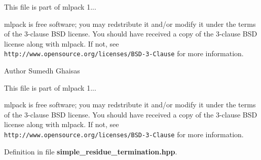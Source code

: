 This file is part of mlpack 1...

mlpack is free software; you may redstribute it and/or modify it under the terms of the 3-\/clause B\-S\-D license. You should have received a copy of the 3-\/clause B\-S\-D license along with mlpack. If not, see {\tt http\-://www.\-opensource.\-org/licenses/\-B\-S\-D-\/3-\/\-Clause} for more information.

\begin{DoxyAuthor}{Author}
Sumedh Ghaisas
\end{DoxyAuthor}
This file is part of mlpack 1...

mlpack is free software; you may redstribute it and/or modify it under the terms of the 3-\/clause B\-S\-D license. You should have received a copy of the 3-\/clause B\-S\-D license along with mlpack. If not, see {\tt http\-://www.\-opensource.\-org/licenses/\-B\-S\-D-\/3-\/\-Clause} for more information. 

Definition in file {\bf simple\-\_\-residue\-\_\-termination.\-hpp}.

